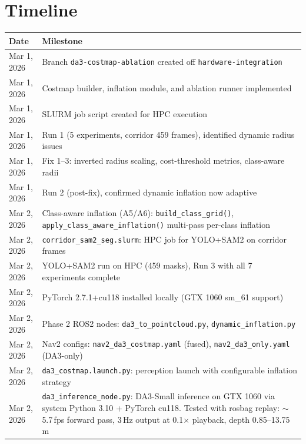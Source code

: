 \documentclass[11pt,a4paper]{article}
\begin{document}
\section{Timeline}
\label{sec:timeline}

\begin{longtable}{lp{10cm}}
\toprule
\textbf{Date} & \textbf{Milestone} \\
\midrule
\endfirsthead
Mar 1, 2026 & Branch \texttt{da3-costmap-ablation} created off \texttt{hardware-integration} \\
Mar 1, 2026 & Costmap builder, inflation module, and ablation runner implemented \\
Mar 1, 2026 & SLURM job script created for HPC execution \\
Mar 1, 2026 & Run 1 (5 experiments, corridor 459 frames), identified dynamic radius issues \\
Mar 1, 2026 & Fix 1--3: inverted radius scaling, cost-threshold metrics, class-aware radii \\
Mar 1, 2026 & Run 2 (post-fix), confirmed dynamic inflation now adaptive \\
Mar 2, 2026 & Class-aware inflation (A5/A6): \texttt{build\_class\_grid()},
              \texttt{apply\_class\_aware\_inflation()} multi-pass per-class inflation \\
Mar 2, 2026 & \texttt{corridor\_sam2\_seg.slurm}: HPC job for YOLO+SAM2 on corridor frames \\
Mar 2, 2026 & YOLO+SAM2 run on HPC (459 masks), Run 3 with all 7 experiments complete \\
Mar 2, 2026 & PyTorch 2.7.1+cu118 installed locally (GTX 1060 sm\_61 support) \\
Mar 2, 2026 & Phase 2 ROS2 nodes: \texttt{da3\_to\_pointcloud.py},
              \texttt{dynamic\_inflation.py} \\
Mar 2, 2026 & Nav2 configs: \texttt{nav2\_da3\_costmap.yaml} (fused),
              \texttt{nav2\_da3\_only.yaml} (DA3-only) \\
Mar 2, 2026 & \texttt{da3\_costmap.launch.py}: perception launch with
              configurable inflation strategy \\
Mar 2, 2026 & \texttt{da3\_inference\_node.py}: DA3-Small inference on
              GTX 1060 via system Python 3.10 + PyTorch cu118.
              Tested with rosbag replay: $\sim$5.7\,fps forward pass,
              3\,Hz output at 0.1$\times$ playback, depth 0.85--13.75\,m \\

\end{longtable}
\end{document}
